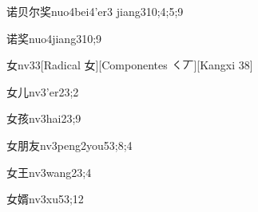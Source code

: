 \begin{verbete}{诺贝尔奖}{nuo4bei4'er3 jiang3}{10;4;5;9}
\end{verbete}

\begin{verbete}{诺奖}{nuo4jiang3}{10;9}
\end{verbete}

\begin{verbete}{女}{nv3}{3}[Radical 女][Componentes ㇛丆][Kangxi 38]
\end{verbete}

\begin{verbete}{女儿}{nv3'er2}{3;2}
\end{verbete}

\begin{verbete}{女孩}{nv3hai2}{3;9}
\end{verbete}

\begin{verbete}{女朋友}{nv3peng2you5}{3;8;4}
\end{verbete}

\begin{verbete}{女王}{nv3wang2}{3;4}
\end{verbete}

\begin{verbete}{女婿}{nv3xu5}{3;12}
\end{verbete}

